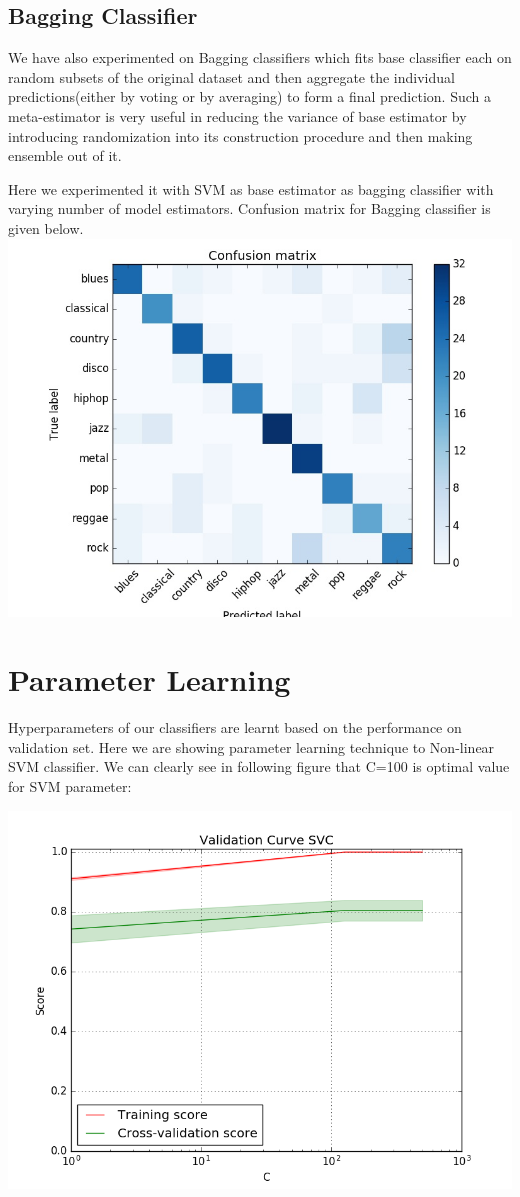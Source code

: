 \documentclass[conference]{IEEEtran}
\begin{document}
\subsection{Bagging Classifier}
\label{sub:Baagging Classification}
We have also experimented on Bagging classifiers which fits base classifier each on random subsets of the original dataset and then aggregate the individual predictions(either by voting or by averaging) to form a final prediction. Such a meta-estimator is very useful in reducing the variance of base estimator by introducing randomization into its construction procedure and then making ensemble out of it.

Here we experimented it with SVM as base estimator as bagging classifier with varying number of model estimators.
Confusion matrix for Bagging classifier is given below.
\includegraphics[width=\columnwidth]{BAGGING}

\section{Parameter Learning}
\label{sec:Results}

Hyperparameters of our classifiers are learnt based on the performance on validation set. Here we are showing parameter learning technique to Non-linear SVM classifier. We can clearly see in following figure that C=100 is optimal value for SVM parameter:

\includegraphics[width=\columnwidth]{validation}
\end{document}
